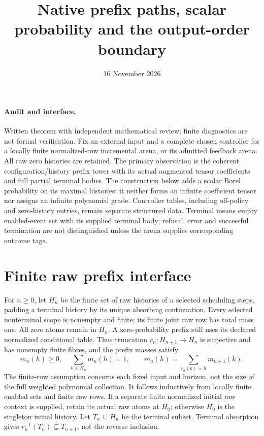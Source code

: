 \documentclass[11pt]{article}
\title{Native prefix paths, scalar probability and the output-order boundary}
\date{16 November 2026}
\begin{document}
\maketitle
\paragraph{Audit and interface.} Written theorem with independent mathematical review; finite diagnostics are not formal verification. Fix an external input and a complete chosen controller for a locally finite normalized-row incremental arena, or its admitted feedback arena. All raw zero histories are retained. The primary observation is the coherent configuration/history prefix tower with its actual augmented tensor coefficients and full partial terminal bodies. The construction below adds a scalar Borel probability on its maximal histories; it neither forms an infinite coefficient tensor nor assigns an infinite polynomial grade. Controller tables, including off-policy and zero-history entries, remain separate structured data. Terminal means empty enabled-event set with its supplied terminal body; refusal, error and successful termination are not distinguished unless the arena supplies corresponding outcome tags.

\section{Finite raw prefix interface}
For $n\geq0$, let $H_n$ be the finite set of raw histories of $n$ selected scheduling steps, padding a terminal history by its unique absorbing continuation. Every selected nonterminal scope is nonempty and finite; its finite joint raw row has total mass one. All zero atoms remain in $H_n$. A zero-probability prefix still uses its declared normalized conditional table. Thus truncation $r_n:H_{n+1}\to H_n$ is surjective and has nonempty finite fibres, and the prefix masses satisfy
\[
 m_n(h)\geq0,\quad \sum_{h\in H_n}m_n(h)=1,
 \qquad m_n(h)=\sum_{r_n(k)=h}m_{n+1}(k).                 \tag{1}
\]
The finite-row assumption concerns each fixed input and horizon, not the size of the full weighted polynomial collection. It follows inductively from locally finite enabled sets and finite raw rows. If a separate finite normalized initial raw context is supplied, retain its actual raw atoms at $H_0$; otherwise $H_0$ is the singleton initial history. Let $T_n\subseteq H_n$ be the terminal subset. Terminal absorption gives $r_n^{-1}(T_n)\subseteq T_{n+1}$, not the reverse inclusion.
\end{document}
